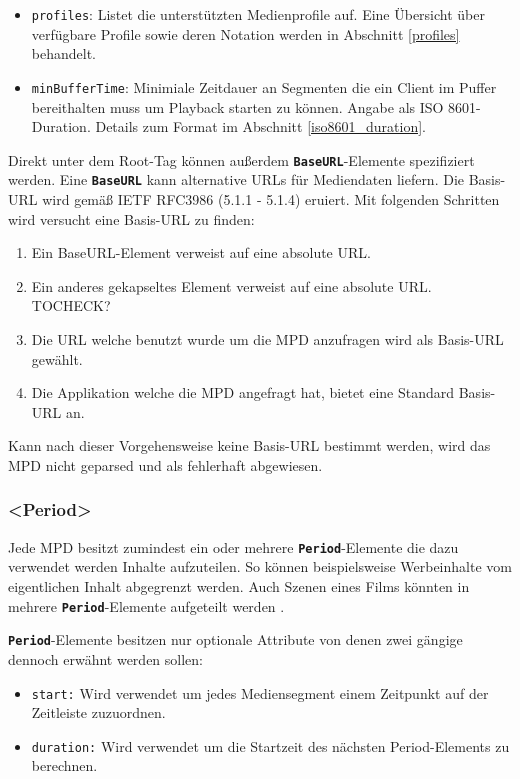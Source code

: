 \documentclass[paper = a4, fontsize = 12pt, parskip = half]{scrartcl} %
\def\attr#1{\texttt{#1}}
\def\elem#1{\texttt{\textbf{#1}}}
\begin{document}
\begin{itemize}
	\item \attr{profiles}: Listet die unterstützten Medienprofile auf. Eine Übersicht über verfügbare Profile sowie deren Notation werden in Abschnitt \ref{profiles} behandelt.
	\item \attr{minBufferTime}: Minimiale Zeitdauer an Segmenten die ein Client im Puffer bereithalten muss um Playback starten zu können. Angabe als ISO 8601-Duration. Details zum Format im Abschnitt \ref{iso8601_duration}.
\end{itemize}

Direkt unter dem Root-Tag können außerdem \elem{BaseURL}-Elemente spezifiziert werden. Eine \elem{BaseURL} kann alternative URLs für Mediendaten liefern.
Die Basis-URL wird gemäß IETF RFC3986 (5.1.1 - 5.1.4) eruiert. Mit folgenden Schritten wird versucht eine Basis-URL zu finden:

\begin{enumerate}
	\item Ein BaseURL-Element verweist auf eine absolute URL.
	\item Ein anderes gekapseltes Element verweist auf eine absolute URL. TOCHECK?
	\item Die URL welche benutzt wurde um die MPD anzufragen wird als Basis-URL gewählt.
	\item Die Applikation welche die MPD angefragt hat, bietet eine Standard Basis-URL an.
\end{enumerate}

Kann nach dieser Vorgehensweise keine Basis-URL bestimmt werden, wird das MPD nicht geparsed und als fehlerhaft abgewiesen.

\subsubsection{<Period>}
Jede MPD besitzt zumindest ein oder mehrere \elem{Period}-Elemente die dazu verwendet werden Inhalte aufzuteilen. So können beispielsweise Werbeinhalte vom eigentlichen Inhalt abgegrenzt werden. Auch Szenen eines Films könnten in mehrere \elem{Period}-Elemente aufgeteilt werden \cite{international_organization_for_standardization_isoiec_nodate}.

\elem{Period}-Elemente besitzen nur optionale Attribute von denen zwei gängige dennoch erwähnt werden sollen:
\begin{itemize}
	\item \attr{start:} Wird verwendet um jedes Mediensegment einem Zeitpunkt auf der Zeitleiste zuzuordnen.
	\item \attr{duration:} Wird verwendet um die Startzeit des nächsten Period-Elements zu berechnen.
\end{itemize}
\end{document}
